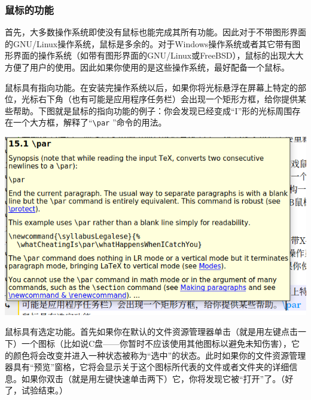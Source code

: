 \subsubsection{鼠标的功能}
首先，大多数操作系统即使没有鼠标也能完成其所有功能。因此对于不带图形界面的GNU/Linux操作系统，鼠标是多余的。对于Windows操作系统或者其它带有图形界面的操作系统（如带有图形界面的GNU/Linux或FreeBSD），鼠标的出现大大方便了用户的使用。因此如果你使用的是这些操作系统，最好配备一个鼠标。\par
鼠标具有指向功能。在安装完操作系统以后，如果你将光标悬浮在屏幕上特定的部位，光标右下角（也有可能是应用程序任务栏）会出现一个矩形方框，给你提供某些帮助。下图就是鼠标的指向功能的例子：你会发现已经变成“I”形的光标周围存在一个大方框，解释了“\verb|\par| ”命令的用法。
\begin{center}
	\includegraphics{pic/Crusor}
\end{center}\par
鼠标具有选定功能。首先如果你在默认的文件资源管理器单击（就是用左键点击一下）一个图标（比如说C盘——你暂时不应该使用其他图标以避免未知伤害），它的颜色将会改变并进入一种状态被称为“选中”的状态。此时如果你的文件资源管理器具有“预览”窗格，它将会显示关于这个图标所代表的文件或者文件夹的详细信息。如果你双击（就是用左键快速单击两下）它，你将发现它被“打开”了。（好了，试验结束。）
